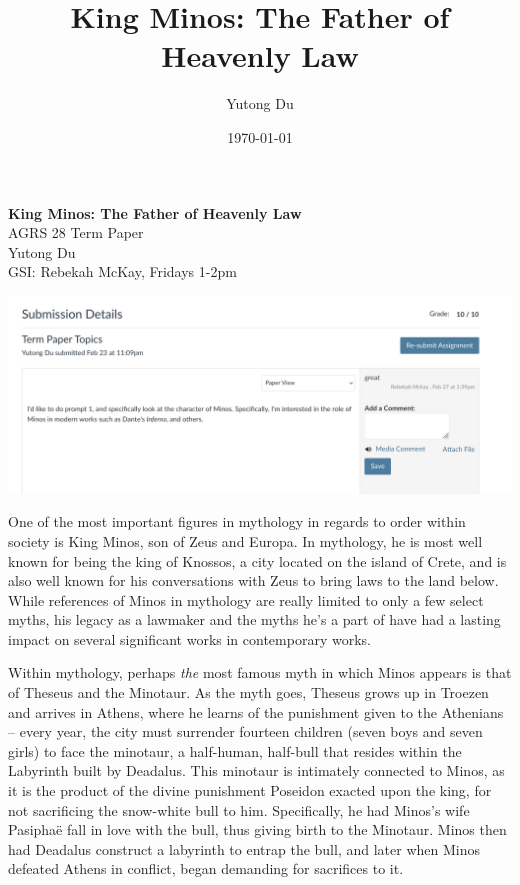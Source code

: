 \documentclass[12pt]{article}
\title{King Minos: The Father of Heavenly Law}
\author{Yutong Du}
\date{\today}
\renewcommand{\maketitle}{%
	\begin{center}
		\textbf{\Large{King Minos: The Father of Heavenly Law}}\\
		\vspace{1.5cm}
		AGRS 28 Term Paper\\
		Yutong Du\\
		GSI: Rebekah McKay, Fridays 1-2pm
	\end{center}
}
\begin{document}
	\begin{titlepage}
		 \vspace*{\fill}
		\maketitle
		 \vspace*{\fill}
	\end{titlepage}	
	\pagebreak
	\begin{center}
		\includegraphics[scale=0.4]{term-paper.png}
	\end{center}
	\pagebreak

	One of the most important figures in mythology in regards to order within society is 
	King Minos, son of Zeus and Europa. In mythology, he is most well known for being the king of Knossos, a city 
	located on the island of Crete, and is also well known for his conversations with Zeus to bring 
	laws to the land below. While references of Minos in mythology are really limited to only a few select myths, 
	his legacy as a lawmaker and the myths he's a part of have had a lasting impact on several significant  
	works in contemporary works. 

	Within mythology, perhaps \textit{the} most famous myth in which Minos appears is that of Theseus and the Minotaur.
	As the myth goes, Theseus grows up in Troezen and arrives in Athens, where he learns of the punishment 
	given to the Athenians -- every year, the city must surrender fourteen children (seven boys and seven girls) 
	to face the minotaur, a half-human, half-bull that resides within the Labyrinth built by Deadalus. This minotaur 
	is intimately connected to Minos, as it is the product of the divine punishment Poseidon exacted upon the king, for 
	not sacrificing the snow-white bull to him. Specifically, he had Minos's wife Pasipha\"{e} fall in love with the 
	bull, thus giving birth to the Minotaur. Minos then had Deadalus construct a labyrinth to entrap the bull, 
	and later when Minos defeated Athens in conflict, began demanding for sacrifices to it.
\end{document}
